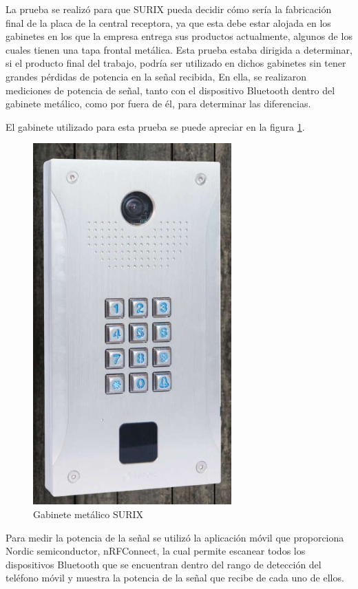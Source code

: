 La prueba se realizó para que SURIX pueda decidir cómo sería la fabricación final de la placa de la central receptora, ya que esta debe estar alojada en los gabinetes en los que la empresa entrega sus productos actualmente, algunos de los cuales tienen una tapa frontal metálica. Esta prueba estaba dirigida a determinar, si el producto final del trabajo, podría ser utilizado en dichos gabinetes sin tener grandes pérdidas de potencia en la señal recibida, En ella, se realizaron mediciones de potencia de señal, tanto con el dispositivo Bluetooth dentro del gabinete metálico, como por fuera de él, para determinar las diferencias.

El gabinete utilizado para esta prueba se puede apreciar en la figura \ref{fig:GMetalico}.

\begin{figure}[htpb]
	\centering
	\includegraphics[scale=0.4]{./Figures/gabMet.jpeg}
	\caption{Gabinete metálico SURIX}
	\label{fig:GMetalico}
\end{figure}

Para medir la potencia de la señal se utilizó la aplicación móvil que proporciona Nordic semiconductor, nRFConnect, la cual permite escanear todos los dispositivos Bluetooth que se encuentran dentro del rango de detección del teléfono móvil y muestra la potencia de la señal que recibe de cada uno de ellos.

